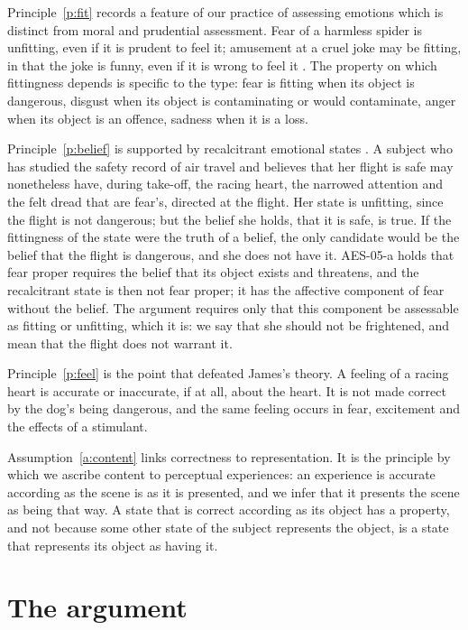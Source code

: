 \documentclass{situationist-preprint}
\begin{document}
Principle~\ref{p:fit} records a feature of our practice of assessing emotions which is distinct from moral and prudential assessment. Fear of a harmless spider is unfitting, even if it is prudent to feel it; amusement at a cruel joke may be fitting, in that the joke is funny, even if it is wrong to feel it \citep{DArmsJacobson2000}. The property on which fittingness depends is specific to the type: fear is fitting when its object is dangerous, disgust when its object is contaminating or would contaminate, anger when its object is an offence, sadness when it is a loss.

Principle~\ref{p:belief} is supported by recalcitrant emotional states \citep{Brady2009}. A subject who has studied the safety record of air travel and believes that her flight is safe may nonetheless have, during take-off, the racing heart, the narrowed attention and the felt dread that are fear's, directed at the flight. Her state is unfitting, since the flight is not dangerous; but the belief she holds, that it is safe, is true. If the fittingness of the state were the truth of a belief, the only candidate would be the belief that the flight is dangerous, and she does not have it. AES-05-a holds that fear proper requires the belief that its object exists and threatens, and the recalcitrant state is then not fear proper; it has the affective component of fear without the belief. The argument requires only that this component be assessable as fitting or unfitting, which it is: we say that she should not be frightened, and mean that the flight does not warrant it.

Principle~\ref{p:feel} is the point that defeated James's theory. A feeling of a racing heart is accurate or inaccurate, if at all, about the heart. It is not made correct by the dog's being dangerous, and the same feeling occurs in fear, excitement and the effects of a stimulant.

Assumption~\ref{a:content} links correctness to representation. It is the principle by which we ascribe content to perceptual experiences: an experience is accurate according as the scene is as it is presented, and we infer that it presents the scene as being that way. A state that is correct according as its object has a property, and not because some other state of the subject represents the object, is a state that represents its object as having it.

\section{The argument}\label{s:argument}
\end{document}
